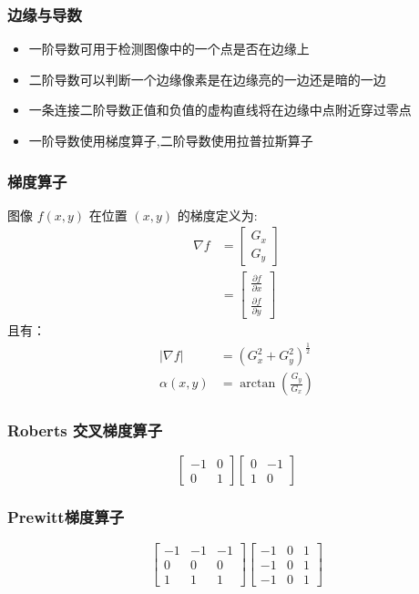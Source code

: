 \documentclass{beamer}
\begin{document}
\begin{frame}
\frametitle{边缘与导数}
\label{sec-2-6}

\begin{itemize}
\item 一阶导数可用于检测图像中的一个点是否在边缘上
\item 二阶导数可以判断一个边缘像素是在边缘亮的一边还是暗的一边
\item 一条连接二阶导数正值和负值的虚构直线将在边缘中点附近穿过零点
\item 一阶导数使用梯度算子,二阶导数使用拉普拉斯算子
\end{itemize}
\end{frame}
\begin{frame}
\frametitle{梯度算子}
\label{sec-2-7}

 图像 $f(x,y)$ 在位置 $(x,y)$ 的梯度定义为:
\begin{align*}
\nabla f&= \begin{bmatrix}
G_x \\
G_y
\end{bmatrix}\\
&=\begin{bmatrix}
\frac{\partial f}{\partial x} \\
\frac{\partial f}{\partial y}
\end{bmatrix}
\end{align*}
且有：
\begin{align*}
    | \nabla f | &= (G_x^2+G_y^2)^{\frac{1}{2}}\\ 
    \alpha(x,y) &= \arctan(\frac{G_y}{G_x})
\end{align*}
\end{frame}
\begin{frame}
\frametitle{Roberts 交叉梯度算子}
\label{sec-2-8}

       \[\begin{bmatrix}
           -1 & 0  \\
            0 & 1 \end{bmatrix}
           \begin{bmatrix}
            0 & -1 \\
           1 &  0 \end{bmatrix}\]
\end{frame}
\begin{frame}
\frametitle{Prewitt梯度算子}
\label{sec-2-9}

       \[\begin{bmatrix}
           -1 & -1 & -1 \\
            0 &  0 &  0 \\
            1 &  1 &  1 \end{bmatrix}
           \begin{bmatrix}
           -1 &  0 &  1 \\
           -1 &  0 &  1 \\
           -1 &  0 &  1 \end{bmatrix}\]
\end{frame}
\end{document}
